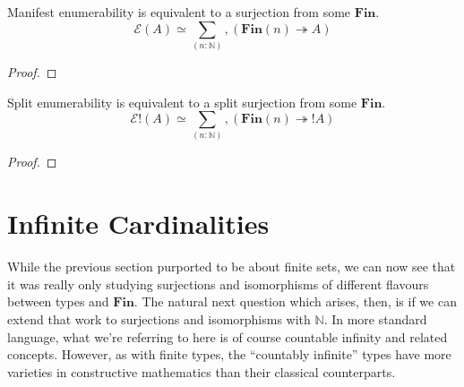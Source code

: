 \begin{rm-lemma}
  Manifest enumerability is equivalent to a surjection from some \(\mathbf{Fin}\).
  \begin{equation}
    \mathcal{E}(A) \simeq \sum_{(n : \mathbb{N})} , \left(  \mathbf{Fin}(n) \twoheadrightarrow A \right)
  \end{equation}
\end{rm-lemma}
\begin{proof}
\end{proof}

\begin{rm-lemma}
  Split enumerability is equivalent to a split surjection from some \(\mathbf{Fin}\).
  \begin{equation}
    \mathcal{E}!(A) \simeq \sum_{(n : \mathbb{N})} , \left(  \mathbf{Fin}(n) \twoheadrightarrow ! A \right)
  \end{equation}
\end{rm-lemma}
\begin{proof}
\end{proof}

\section{Infinite Cardinalities} \label{infinite-cardinalities}
While the previous section purported to be about finite sets, we can now see
that it was really only studying surjections and isomorphisms of different
flavours between types and \(\mathbf{Fin}\).
The natural next question which arises, then, is if we can extend that work to
surjections and isomorphisms with \(\mathbb{N}\).
In more standard language, what we're referring to here is of course
countable infinity and related concepts.
However, as with finite types, the ``countably infinite'' types have more
varieties in constructive mathematics than their classical counterparts.
